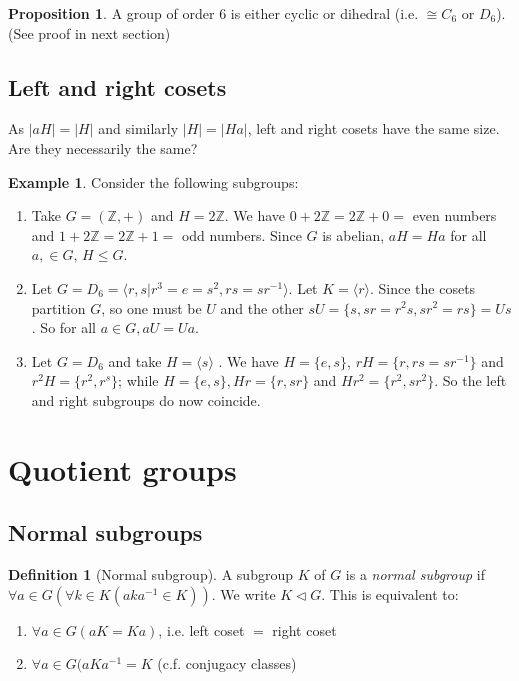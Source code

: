 \documentclass[a4paper]{article}
\theoremstyle{definition}
\newtheorem*{prop}{Proposition}
\newtheorem*{defi}{Definition}
\newtheorem*{eg}{Example}
\newcommand{\Z}{\mathbb{Z}}
\newcommand{\bra}{\langle}
\newcommand{\ket}{\rangle}
\let\stdsection\section
\renewcommand\section{\newpage\stdsection}
\begin{document}
\begin{prop}
  A group of order $6$ is either cyclic or dihedral (i.e. $\cong C_6$ or $D_6$). (See proof in next section)
\end{prop}

\subsection{Left and right cosets}
As $|aH| = |H|$  and similarly $|H| = |Ha|$, left and right cosets have the same size. Are they necessarily the same?
\begin{eg}
  Consider the following subgroups:
  \begin{enumerate}
  \item Take $G = (\Z, +)$ and $H = 2\Z$. We have $0 + 2\Z = 2\Z + 0 = $ even numbers and $1 + 2\Z = 2\Z + 1 = $ odd numbers. Since $G$ is abelian, $aH = Ha$ for all $a, \in G$, $H\leq G$.
  \item Let $G = D_6 = \bra r, s | r^3 = e = s^2, rs = sr^{-1}\ket$. Let $K = \bra r\ket$. Since the cosets partition $G$, so one must be $U$ and the other $sU = \{s, sr = r^2s, sr^2 = rs\} = Us$. So for all $a\in G, aU = Ua$. 
  \item Let $G = D_6$ and take $H = \bra s\ket$ . We have $H = \{e, s\}$, $rH = \{r, rs = sr^{-1}\}$ and $r^2 H = \{r^2, r^s\}$; while $H = \{e, s\}, Hr = \{r, sr\}$ and $Hr^2=\{r^2, sr^2\}$. So the left and right subgroups do now coincide.
  \end{enumerate}
\end{eg}

\section{Quotient groups}
\subsection{Normal subgroups}
\begin{defi}[Normal subgroup]
  A subgroup $K$ of $G$ is a \emph{normal subgroup} if $\forall a\in G(\forall k\in K(aka^{-1}\in K))$. We write $K\lhd G$. This is equivalent to:
  \begin{enumerate}
  \item $\forall a\in G(aK = Ka)$, i.e. left coset $=$ right coset
  \item $\forall a\in G(aKa^{-1} = K$ (c.f. conjugacy classes)
  \end{enumerate}
\end{defi}
\end{document}
